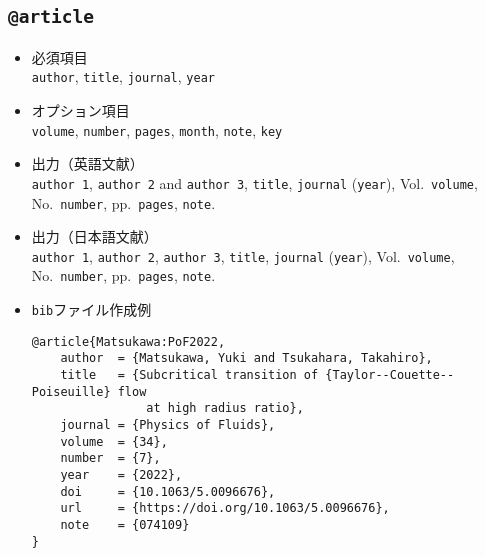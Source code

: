 \documentclass[a4paper,fleqn,uplatex,dvipdfmx]{jsarticle}
\begin{document}
\subsection{\texttt{@article}}
\label{ssec:article}
\begin{screen}
    \begin{itemize}
        \item 必須項目 \\
        \verb|author|, \verb|title|, \verb|journal|, \verb|year|
        \item オプション項目 \\
        \verb|volume|, \verb|number|, \verb|pages|, \verb|month|, \verb|note|, \verb|key|
        \item 出力（英語文献） \\
            \colorbox[gray]{0.8}{\texttt{author 1}}, \colorbox[gray]{0.8}{\texttt{author 2}} and \colorbox[gray]{0.8}{\texttt{author 3}}, \colorbox[gray]{0.8}{\texttt{title}}, \colorbox[gray]{0.8}{\texttt{journal}} (\colorbox[gray]{0.8}{\texttt{year}}), Vol.~\colorbox[gray]{0.8}{\texttt{volume}}, No.~\colorbox[gray]{0.8}{\texttt{number}}, pp.~\colorbox[gray]{0.8}{\texttt{pages}}, \colorbox[gray]{0.8}{\texttt{note}}.
        \item 出力（日本語文献） \\
            \colorbox[gray]{0.8}{\texttt{author 1}}, \colorbox[gray]{0.8}{\texttt{author 2}}, \colorbox[gray]{0.8}{\texttt{author 3}}, \colorbox[gray]{0.8}{\texttt{title}}, \colorbox[gray]{0.8}{\texttt{journal}} (\colorbox[gray]{0.8}{\texttt{year}}), Vol.~\colorbox[gray]{0.8}{\texttt{volume}}, No.~\colorbox[gray]{0.8}{\texttt{number}}, pp.~\colorbox[gray]{0.8}{\texttt{pages}}, \colorbox[gray]{0.8}{\texttt{note}}.
        \item \verb|bib|ファイル作成例 \vspace{-3mm}
\begin{verbatim}
@article{Matsukawa:PoF2022,
    author  = {Matsukawa, Yuki and Tsukahara, Takahiro},
    title   = {Subcritical transition of {Taylor--Couette--Poiseuille} flow 
                at high radius ratio},
    journal = {Physics of Fluids},
    volume  = {34},
    number  = {7},
    year    = {2022},
    doi     = {10.1063/5.0096676},
    url     = {https://doi.org/10.1063/5.0096676},
    note    = {074109}
}
\end{verbatim}
    \end{itemize}
\end{screen}
\end{document}
